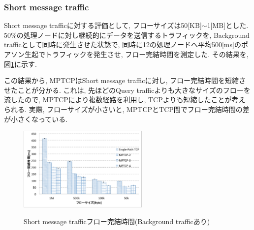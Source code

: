 \documentclass[11pt, a4paper, uplatex]{jsarticle}
\begin{document}
\subsubsection{Short message traffic}
Short message trafficに対する評価として, フローサイズは50[KB]$\sim$1[MB]とした.
50\%の処理ノードに対し継続的にデータを送信するトラフィックを, Background trafficとして同時に発生させた状態で,
同時に12の処理ノードへ平均500[ms]のポアソン生起でトラフィックを発生させ, フロー完結時間を測定した.
その結果を, 図\ref{fig:short_query}に示す.

この結果から, MPTCPはShort message trafficに対し, フロー完結時間を短縮させたことが分かる.
これは, 先ほどのQuery trafficよりも大きなサイズのフローを流したので, MPTCPにより複数経路を利用し, TCPよりも短縮したことが考えられる.
実際, フローサイズが小さいと, MPTCPとTCP間でフロー完結時間の差が小さくなっている.

\begin{figure}[h]
    \begin{center}
    \includegraphics[autoebb, width=180pt]{./img/mix_short.pdf}
    \caption{Short message trafficフロー完結時間(Background trafficあり)}
    \label{fig:short_query}
    \end{center}
\end{figure}


%
%
\end{document}
